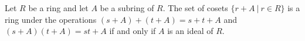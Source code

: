 
\begin{theorem}
	Let $R$ be a ring and let $A$ be a subring of $R$. The set of cosets $\{r + A\ \vert\ r \in R\}$ is a ring under the operations $(s + A) + (t + A) = s + t + A$ and $(s+A)(t+A)=st+A$ if and only if $A$ is an ideal of $R$.
\end{theorem}
